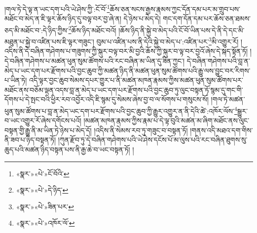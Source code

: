 །གལ་ཏེ་དེ་ལྟ་ན་ཡང་དག་པའི་ཡེ་ཤེས་ཀྱི་:ངོ་བོ་\footnote{«སྣར་»«པེ་»ངོ་བོའི་}ཆོས་ཅན་སངས་རྒྱས་རྣམས་ཀྱང་དོན་དམ་པར་མ་གྲུབ་པས་མཐོང་བ་མེད་ན་ཇི་ལྟར་ཆོས་ཉིད་དུ་བལྟ་བར་བྱ་ཞེ་ན། དེ་ཉེས་པ་མེད་དེ། གང་དག་དོན་དམ་པར་ཆོས་ཅན་ཐམས་ཅད་མི་མཐོང་བ་:དེ་ཉིད་ཀྱིས་\footnote{«སྣར་»«པེ་»དེ་ཉིད་}ཆོས་ཉིད་མཐོང་བའོ། །ཆོས་ཉིད་ནི་སྐྱེ་བ་མེད་པའི་ངོ་བོ་ཡིན་པས་དེ་ནི་དེ་དང་མི་མཐུན་པ་སྐྱེ་བ་འཛིན་པས་ཇི་ལྟར་གཟུང་། བུམ་པ་འཛིན་པས་ནི་དེའི་སྐྱེ་བ་མེད་པ་:འཛིན་པར་\footnote{«སྣར་»«པེ་»ཟིན་པར་}མི་འགྱུར་རོ། །འདིས་ནི་དེ་བཞིན་གཤེགས་པ་གཟུགས་ཀྱི་སྐུར་བལྟ་བར་མི་བྱའི་ཆོས་ཀྱི་སྐུར་བ་ལྟ་བར་བྱའོ་ཞེས་དེ་སྐད་སྟོན་ཏོ། །དེ་བཞིན་གཤེགས་པ་མཚན་ཕུན་སུམ་ཚོགས་པའི་རང་བཞིན་མ་ཡིན་དུ་ཟིན་ཀྱང་། དེ་བཞིན་གཤེགས་པའི་བླ་ན་མེད་པ་ཡང་དག་པར་རྫོགས་པའི་བྱང་ཆུབ་ཀྱི་མཚན་ཉིད་ནི་མཚན་ཕུན་སུམ་ཚོགས་པའི་རྒྱུ་ལས་བྱུང་བར་རིགས་པ་ཡིན་ཏེ། འདི་ལྟར་བྱང་ཆུབ་སེམས་དཔར་གྱུར་པ་ནི་མཚན་མཁན་རྣམས་ཀྱིས་མཚན་ཕུན་སུམ་ཚོགས་པར་མཐོང་ནས་བཅོམ་ལྡན་འདས་བླ་ན་མེད་པ་ཡང་དག་པར་རྫོགས་པའི་བྱང་ཆུབ་ཏུ་ལུང་བསྟན་ཏོ་སྙམ་དུ་གང་གི་དོགས་པ་དེ་སྤང་བའི་ཕྱིར་རབ་འབྱོར་འདི་ཇི་སྙམ་དུ་སེམས་ཞེས་བྱ་བ་ལ་སོགས་པ་གསུངས་སོ། །གལ་ཏེ་མཚན་ཕུན་སུམ་ཚོགས་པ་བླ་ན་མེད་ཡང་དག་པར་རྫོགས་པའི་བྱང་ཆུབ་ཀྱི་རྒྱུར་འགྱུར་ན་ནི་དེའི་ཚེ་:འཁོར་ལོས་\footnote{«སྣར་»«པེ་»འཁོར་ལོ་}སྒྱུར་བ་ཡང་འགྱུར་རོ་ཞེས་དགོངས་པའོ། །མཚན་མཁན་རྣམས་ཀྱིས་རྣམ་པ་དེ་ལྟ་བུའི་མཚན་མ་ཞིག་མཐོང་ནས་ལུང་བསྟན་གྱི་རྒྱུ་ནི་མ་ཡིན་ཏེ་ཉེས་པ་མེད་དོ། །འདིས་ནི་སེམས་རབ་ཏུ་གཟུང་བ་བསྟན་ཏོ། །གནས་འདི་མཐའ་དག་གིས་ནི་ཟབ་པ་ཉིད་བསྟན་ཏོ། །ཀུན་རྫོབ་ཏུ་དེ་བཞིན་གཤེགས་པའི་ཡེ་ཤེས་དངོས་པོ་མ་ལུས་པའི་རང་བཞིན་ཐུགས་སུ་ཆུད་པའི་མཚན་ཉིད་བསྟན་པས་ནི་རྒྱ་ཆེ་བ་ཡང་བསྟན་ཏོ། །
